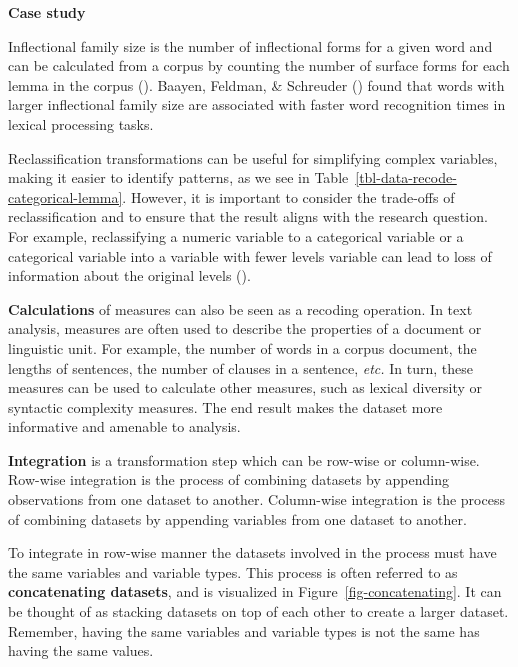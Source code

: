 \documentclass[
  letterpaper,
  krantz1]{latex/krantz-mod}
\theoremstyle{definition}
\theoremstyle{definition}
\theoremstyle{remark}
\begin{document}
\begin{tcolorbox}[enhanced jigsaw, leftrule=.75mm, colframe=quarto-callout-color-frame, left=2mm, colback=white, toprule=.15mm, breakable, arc=.35mm, opacityback=0, bottomrule=.15mm, rightrule=.15mm]

\textbf{ Case study}

Inflectional family size is the number of inflectional forms for a given
word and can be calculated from a corpus by counting the number of
surface forms for each lemma in the corpus
(). Baayen,
Feldman, \& Schreuder () found that words
with larger inflectional family size are associated with faster word
recognition times in lexical processing tasks.

\end{tcolorbox}

Reclassification transformations can be useful for simplifying complex
variables, making it easier to identify patterns, as we see in
Table~\ref{tbl-data-recode-categorical-lemma}. However, it is important
to consider the trade-offs of reclassification and to ensure that the
result aligns with the research question. For example, reclassifying a
numeric variable to a categorical variable or a categorical variable
into a variable with fewer levels variable can lead to loss of
information about the original levels ().

\textbf{Calculations} of measures can also be seen as a recoding
operation. In text analysis, measures are often used to describe the
properties of a document or linguistic unit. For example, the number of
words in a corpus document, the lengths of sentences, the number of
clauses in a sentence, \emph{etc.} In turn, these measures can be used
to calculate other measures, such as lexical diversity or syntactic
complexity measures. The end result makes the dataset more informative
and amenable to analysis.

\textbf{Integration} is a transformation step which can be row-wise or
column-wise. Row-wise integration is the process of combining datasets
by appending observations from one dataset to another. Column-wise
integration is the process of combining datasets by appending variables
from one dataset to another.

To integrate in row-wise manner the datasets involved in the process
must have the same variables and variable types. This process is often
referred to as \textbf{concatenating datasets}, and is visualized in
Figure~\ref{fig-concatenating}. It can be thought of as stacking
datasets on top of each other to create a larger dataset. Remember,
having the same variables and variable types is not the same has having
the same values.
\end{document}
